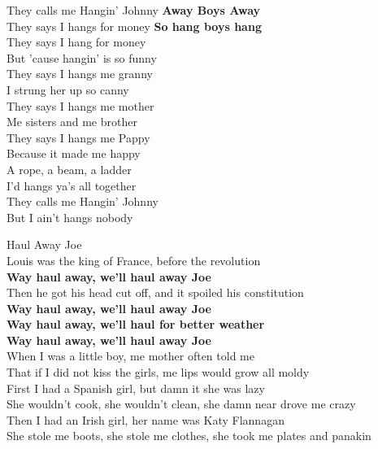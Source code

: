 \documentclass[letterpaper,9pt]{article}
\begin{document}
\huge
They calls me Hangin' Johnny \textbf{Away Boys Away} \\
They says I hangs for money \textbf{So hang boys hang} \\

They says I hang for money \\
But 'cause hangin' is so funny \\

They says I hangs me granny \\
I strung her up so canny \\

They says I hangs me mother \\
Me sisters and me brother \\

They says I hangs me Pappy \\
Because it made me happy \\

A rope, a beam, a ladder \\
I'd hangs ya's all together \\

They calls me Hangin' Johnny \\
But I ain't hangs nobody \\

\newpage
{}
\Huge
Haul Away Joe\\

\LARGE
Louis was the king of France, before the revolution \\
\textbf{Way haul away, we'll haul away Joe} \\
Then he got his head cut off, and it spoiled his constitution \\
\textbf{Way haul away, we'll haul away Joe \\
Way haul away, we'll haul for better weather \\
Way haul away, we'll haul away Joe} \\

When I was a little boy, me mother often told me \\
That if I did not kiss the girls, me lips would grow all moldy \\

First I had a Spanish girl, but damn it she was lazy \\
She wouldn't cook, she wouldn't clean, she damn near drove me crazy \\

Then I had an Irish girl, her name was Katy Flannagan \\
She stole me boots, she stole me clothes, she took me plates and panakin \\
\end{document}
